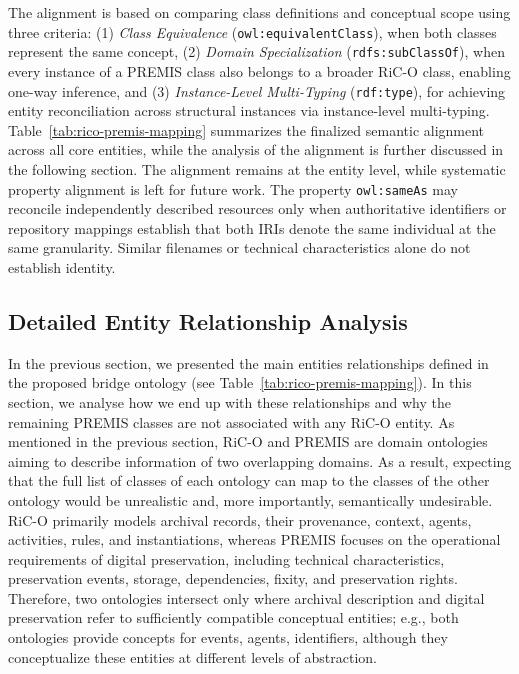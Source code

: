 \documentclass[runningheads]{llncs}
\begin{document}
 The alignment is based on comparing class definitions and conceptual scope using three criteria: 
 (1) \textit{Class Equivalence} (\texttt{owl:equivalentClass}), when both classes represent the same concept, (2) \textit{Domain Specialization} (\texttt{rdfs:subClassOf}), when every instance of a PREMIS class also belongs to a broader RiC-O class, enabling one-way inference, and (3) \textit{Instance-Level Multi-Typing} (\texttt{rdf:type}), for achieving entity reconciliation across structural instances via instance-level multi-typing.
 Table~\ref{tab:rico-premis-mapping} summarizes the finalized semantic alignment across all core entities, while the analysis of the alignment is further discussed in the following section. The alignment remains at the entity level, while systematic property alignment is left for future work.
The property \texttt{owl:sameAs} may reconcile independently described resources only when authoritative identifiers or repository mappings establish that both IRIs denote the same individual at the same granularity. Similar filenames or technical characteristics alone do not establish identity.

\subsection{Detailed Entity Relationship Analysis}
\label{subsec:detailed-alignment}

In the previous section, we presented the main entities relationships defined in the proposed bridge ontology (see Table~\ref{tab:rico-premis-mapping}). In this section, we analyse how we end up with these relationships and why the remaining PREMIS classes are not associated with any RiC-O entity. As mentioned in the previous section, RiC-O and PREMIS are domain ontologies aiming to describe information of two overlapping domains. As a result, expecting that the full list of classes of each ontology can map to the classes of the other ontology would be unrealistic and, more importantly, semantically undesirable. RiC-O primarily models archival records, their provenance, context, agents, activities, rules, and instantiations, whereas PREMIS focuses on the operational requirements of digital preservation, including technical characteristics, preservation events, storage, dependencies, fixity, and preservation rights. Therefore, two ontologies intersect only where archival description and digital preservation refer to sufficiently compatible conceptual entities; e.g., both ontologies provide concepts for events, agents, identifiers, although they conceptualize these entities at different levels of abstraction.  
\end{document}
